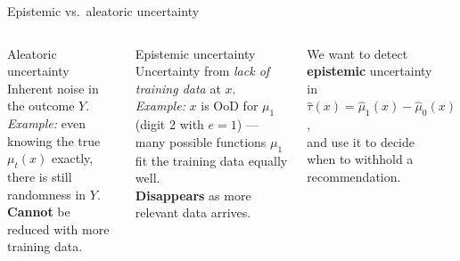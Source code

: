\documentclass[aspectratio=169]{beamer}
\begin{document}
\begin{frame}{Epistemic vs.\ aleatoric uncertainty}

\begin{columns}
\begin{block}{Aleatoric uncertainty}
Inherent noise in the outcome $Y$.\\[4pt]
\textit{Example:} even knowing the true $\mu_t(x)$ exactly, there is still
randomness in $Y$.\\[4pt]
\textbf{Cannot} be reduced with more training data.
\end{block}

\vspace{8pt}

\begin{block}{Epistemic uncertainty}
Uncertainty from \emph{lack of training data} at $x$.\\[4pt]
\textit{Example:} $x$ is OoD for $\mu_1$ (digit 2 with $e=1$) --- many possible
functions $\mu_1$ fit the training data equally well.\\[4pt]
\textbf{Disappears} as more relevant data arrives.
\end{block}

\begin{center}
We want to detect\\[6pt]
\textbf{epistemic} uncertainty\\[6pt]
in $\hat\tau(x) = \hat\mu_1(x)-\hat\mu_0(x)$,\\[6pt]
and use it to decide\\
when to withhold a recommendation.
\end{center}
\end{columns}
\end{frame}
\end{document}
